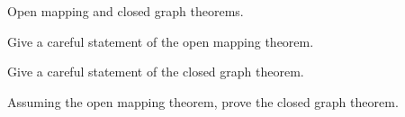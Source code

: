 Open mapping and closed graph theorems.
\begin{alist}
\item Give a careful statement of the open mapping theorem.
\item Give a careful statement of the closed graph theorem.
\item Assuming the open mapping theorem, prove the closed graph
theorem.
\end{alist}
